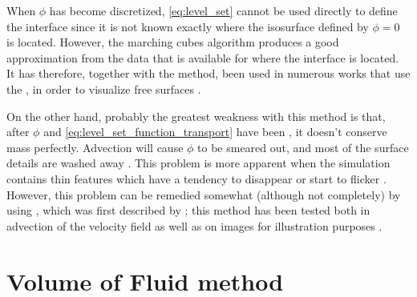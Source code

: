 When $\phi$ has become discretized, \eqref{eq:level_set} cannot be used directly to define the interface since it is not known exactly where the isosurface defined by $\phi = 0$ is located. However, the marching cubes algorithm produces a good approximation from the data that is available for where the interface is located. It has therefore, together with the \LS method, been used in numerous works that use the \FVM, in order to visualize free surfaces \citep[e.g.][]{Losasso2004}.

On the other hand, probably the greatest weakness with this method is that, after $\phi$ and \eqref{eq:level_set_function_transport} have been \discretized, it doesn't conserve mass perfectly. Advection will cause $\phi$ to be smeared out, and most of the surface details are washed away \citep{Wojtan2009}. This problem is more apparent when the simulation contains thin features which have a tendency to disappear or start to flicker \citep{nthuerey2009}. However, this problem can be remedied somewhat (although not completely) by using \BFECC, which was first described by \citet{Dupont2003}; this method has been tested both in advection of the velocity field as well as on images for illustration purposes \citep{Kim2005}.

\section{Volume of Fluid method}

\label{sec:vof}

